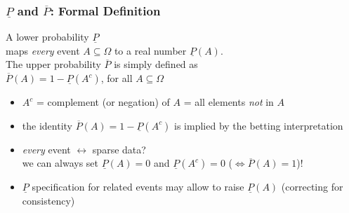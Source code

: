 \documentclass{beamer}
\newcommand{\lpr}{\underline{P}}
\newcommand{\upr}{\overline{P}}
\begin{document}
\begin{frame}
  \frametitle{$\lpr$ and $\upr$: Formal Definition}
  \begin{definition}
    A \alert{lower probability} $\lpr$
    \\
    maps
    \textit{every}
    event $A\subseteq\Omega$ to a real number $\lpr(A)$.
    \\[1ex]
    The \alert{upper probability} $\upr$ is simply defined as \\
    $\upr(A)=1-\lpr(A^c)$, for all $A\subseteq\Omega$
  \end{definition}
  \begin{itemize}
  \item<2-> $A^c$ = \alert{complement} (or \alert{negation}) of $A$ = all elements {\it not} in $A$
  \item<3-> the identity $\upr(A)=1-\lpr(A^c)$ is implied
    by the betting interpretation %
  \item<4-> \textit{every} event $\leftrightarrow$ sparse data? \\
    we can always set $\lpr(A)=0$ and $\lpr(A^c)=0$ ($\iff\upr(A)=1$)!
  \item<5-> $\lpr$ specification for related events may allow to raise $\lpr(A)$ (correcting for consistency)
  \end{itemize}
\end{frame}
\end{document}
